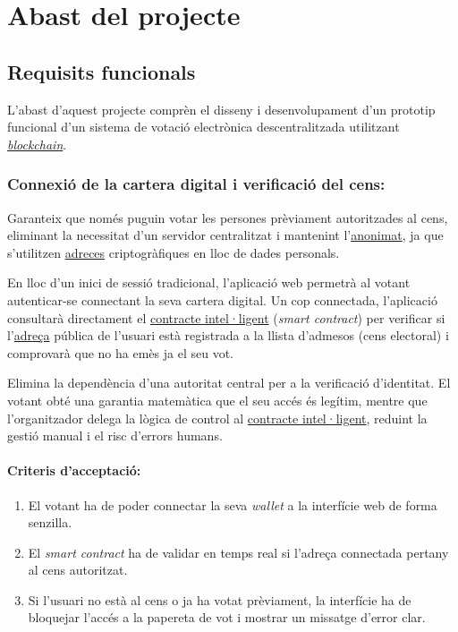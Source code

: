 \section{Abast del projecte}

\subsection{Requisits funcionals}

L'abast d'aquest projecte comprèn el disseny i desenvolupament d'un prototip funcional d'un sistema de votació electrònica descentralitzada utilitzant \hyperlink{def:blockchain}{\textit{blockchain}}.

\subsubsection{Connexió de la cartera digital i verificació del cens:}

Garanteix que només puguin votar les persones prèviament autoritzades al cens, eliminant la necessitat d'un servidor centralitzat i mantenint l'\hyperlink{def:anonimat}{anonimat}, ja que s'utilitzen \hyperlink{def:adreca}{adreces} criptogràfiques en lloc de dades personals.

En lloc d'un inici de sessió tradicional, l'aplicació web permetrà al votant autenticar-se connectant la seva cartera digital.
Un cop connectada, l'aplicació consultarà directament el \hyperlink{def:smartcontract}{contracte intel·ligent} (\textit{smart contract}) per verificar si l'\hyperlink{def:adreca}{adreça} pública de l'usuari està registrada a la llista d'admesos (cens electoral) i comprovarà que no ha emès ja el seu vot.

Elimina la dependència d'una autoritat central per a la verificació d'identitat.
El votant obté una garantia matemàtica que el seu accés és legítim, mentre que l'organitzador delega la lògica de control al \hyperlink{def:smartcontract}{contracte intel·ligent}, reduint la gestió manual i el risc d'errors humans.

\paragraph{Criteris d'acceptació:}
\begin{enumerate}[label=\roman*.]
    \item El votant ha de poder connectar la seva \textit{wallet} a la interfície web de forma senzilla.
    \item El \textit{smart contract} ha de validar en temps real si l'adreça connectada pertany al cens autoritzat.
    \item Si l'usuari no està al cens o ja ha votat prèviament, la interfície ha de bloquejar l'accés a la papereta de vot i mostrar un missatge d'error clar.
\end{enumerate}

